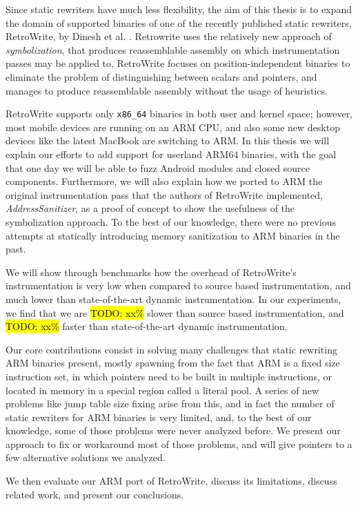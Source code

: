 \documentclass[a4paper,11pt,oneside]{report}
\newcommand{\sysname}{RetroWrite\xspace}
\newcommand{\todo}[1]{%
	\begingroup 
	\sethlcolor{cyan}%
	\hl{TODO: #1}%
	\endgroup
}
\begin{document}
Since static rewriters have much less flexibility, the aim of this thesis is to 
expand the domain of supported binaries of one of the recently published static 
rewriters, \sysname, by Dinesh et al. \cite{dinesh20oakland}. Retrowrite uses 
the relatively new approach of \emph{symbolization}, that produces 
reassemblable assembly on which instrumentation passes may be applied to.  
\sysname focuses on position-independent binaries to eliminate the problem of 
distinguishing between scalars and pointers, and manages to produce 
reassemblable assembly without the usage of heuristics. 

\sysname supports only \texttt{x86\_64} binaries in both user and kernel 
space; however, most mobile devices are running on an ARM CPU, and also some 
new desktop devices like the latest MacBook are switching to ARM. In this 
thesis we will explain our efforts to add support for userland ARM64 binaries, 
with the goal that one day we will be able to fuzz Android modules and closed 
source components. Furthermore, we will also explain how we ported to ARM the 
original instrumentation pass that the authors of \sysname implemented, 
\emph{AddressSanitizer}, as a proof of concept to show the usefulness of the 
symbolization approach. To the best of our knowledge, there were no previous 
attempts at statically introducing memory sanitization to ARM binaries in the 
past. 

We will show through benchmarks how the overhead of \sysname's 
instrumentation is very low when compared to source based instrumentation, and 
much lower than state-of-the-art dynamic instrumentation. In our experiments, 
we find that we are \todo{xx\%} slower than source based instrumentation, and 
\todo{xx\%} faster than state-of-the-art dynamic instrumentation.

Our core contributions consist in solving many challenges that static rewriting 
ARM binaries present, mostly spawning from the fact that ARM is a fixed size 
instruction set, in which pointers need to be built in multiple instructions, 
or located in memory in a special region called a literal pool. A series of new 
problems like jump table size fixing arise from this, and in fact the number of 
static rewriters for ARM binaries is very limited, and, to the best of our 
knowledge, some of those problems were never analyzed before.  We present our 
approach to fix or workaround most of those problems, and will give pointers to 
a few alternative solutions we analyzed.

We then evaluate our ARM port of \sysname , discuss its limitations, discuss 
related work, and present our conclusions.
\end{document}
